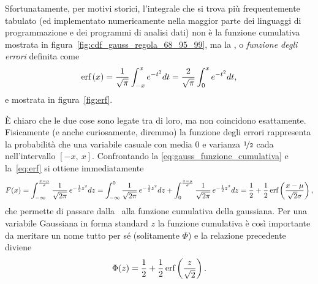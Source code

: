 Sfortunatamente, per motivi storici, l'integrale che si trova più
frequentemente tabulato (ed implementato numericamente nella maggior parte dei
linguaggi di programmazione e dei programmi di analisi dati) non è la
funzione cumulativa mostrata in figura~\ref{fig:cdf_gauss_regola_68_95_99}, ma
la \errorfunc, o \emph{funzione degli errori} definita come
\begin{align}\label{eq:erf}
  \text{erf}\left(x\right) = \frac{1}{\sqrt{\pi}}\int_{-x}^{x} e^{-t^2}dt =
  \frac{2}{\sqrt{\pi}}\int_{0}^{x} e^{-t^2}dt,
\end{align}
e mostrata in figura~\ref{fig:erf}.

\`E chiaro che le due cose sono legate tra di loro, ma non coincidono
esattamente. Fisicamente (e anche curiosamente, diremmo) la funzione degli
errori rappresenta la probabilità che una variabile casuale con media $0$ e
varianza $\nicefrac{1}{2}$ cada nell'intervallo $[-x,~x]$. Confrontando la
\eqref{eq:gauss_funzione_cumulativa} e la~\eqref{eq:erf} si ottiene
immediatamente
\begin{align}
  F(x) = \int_{-\infty}^{\frac{x - \mu}{\sigma}} \frac{1}{\sqrt{2\pi}}\,
  e^{-\frac{1}{2}z^2} dz =
  \int_{-\infty}^{0} \frac{1}{\sqrt{2\pi}}\, e^{-\frac{1}{2}z^2} dz +
  \int_{0}^{\frac{x - \mu}{\sigma}} \frac{1}{\sqrt{2\pi}}\, e^{-\frac{1}{2}z^2} dz =
  \frac{1}{2} + \frac{1}{2}\, \text{erf}\left(\frac{x - \mu}{\sqrt{2}\sigma}\right),
\end{align}
che permette di passare dalla \errorfunc\ alla funzione cumulativa
della gaussiana. Per una variabile Gaussiana in forma standard $z$ la funzione
cumulativa è così importante da meritare un nome tutto per sé
(solitamente $\Phi$) e la relazione precedente diviene
\begin{align}
  \Phi(z) = \frac{1}{2} + \frac{1}{2}\, \text{erf}\left(\frac{z}{\sqrt{2}}\right).
\end{align}

\begin{snippet}[htb!]
  \bigskip %
\end{snippet}

